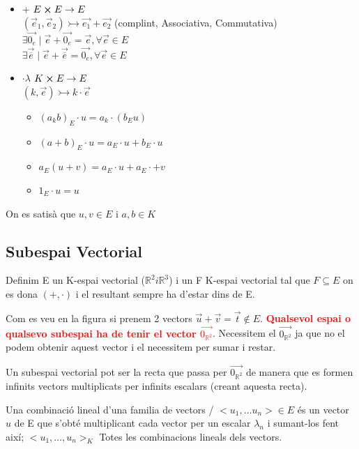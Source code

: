 \documentclass[12pt]{article}
\newcommand{\R}{\mathbb{R}}
\begin{document}
\begin{itemize}
    \item + $E \cross E \rightarrow E$\\
    $(\vec{e}_1, \vec{e}_2) \rightarrowtail \vec{e_1} + \vec{e_2}$ (complint, Associativa, Commutativa)\\
    $\exists \vec{0_e} \mid \vec{e} + \vec{0_e} = \vec{e}, \forall \vec{e} \in E$\\
    $\exists \vec{\overline{e}} \mid \vec{e} + \vec{\overline{e}} = \vec{0_e}, \forall \vec{e} \in E$
    \item $\cdot \lambda$ $K \cross E \rightarrow E$\\
    $(k, \vec{e}) \rightarrowtail k \cdot \vec{e}$
    \begin{itemize}
        \item $(a_kb)_E \cdot u = a_k\cdot(b_E u)$
        \item $(a+b)_E \cdot u = a_E \cdot u + b_E \cdot u$
        \item $a_E(u+v) = a_E\cdot u + a_E \cdot + v$
        \item $1_E \cdot u = u$
    \end{itemize}
\end{itemize}

On es satisà que $u,v\in E$ i $a,b \in K$

\subsection{Subespai Vectorial}

Definim E un K-espai vectorial ($\R^2 i \R^3$) i un F K-espai vectorial tal que $F\subseteq E$ on es dona $(+, \cdot)$ i el resultant sempre ha d'estar dins de E.


Com es veu en la figura si prenem 2 vectors $\vec{u} + \vec{v} = \vec{t} \notin E$. \textbf{\textcolor{red}{Qualsevol espai o qualsevo subespai ha de tenir el vector $\vec{0_{\R^2}}$}}. Necessitem el $\vec{0_{\R^2}}$ ja que no el podem obtenir aquest vector i el necessitem per sumar i restar.

Un subespai vectorial pot ser la recta que passa per $\vec{0_{\R^2}}$ de manera que es formen infinits vectors multiplicats per infinits escalars (creant aquesta recta). 

Una combinació lineal d'una familia de vectors / $<u_1, \dots u_n>\in E$ és un vector $u$ de E que s'obté multiplicant cada vector per un escalar $\lambda_n$ i sumant-los fent així; $<u_1,\dots,u_n>_K$ Totes les combinacions lineals dels vectors.
\end{document}
